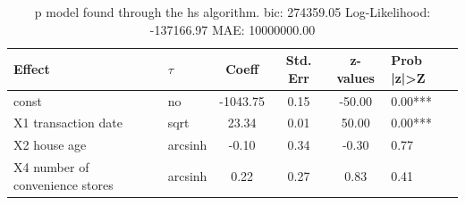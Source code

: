 \begin{table}
	\caption{p model found through the hs algorithm. bic: 274359.05 Log-Likelihood: -137166.97 MAE: 10000000.00}
	\begin{center}
		\begin{tabular}{|l|l|c|c|c|l|}
			\hline
			Effect & $\tau$ & Coeff & Std. Err & z-values & Prob |z|>Z \\
			\hline
			const & no & -1043.75 & 0.15 & -50.00 & 0.00*** \\
			\hline
			X1 transaction date & sqrt & 23.34 & 0.01 & 50.00 & 0.00*** \\
			\hline
			X2 house age & arcsinh & -0.10 & 0.34 & -0.30 & 0.77 \\
			\hline
			X4 number of convenience stores & arcsinh & 0.22 & 0.27 & 0.83 & 0.41 \\
			\hline
		\end{tabular}
	\end{center}
\end{table}